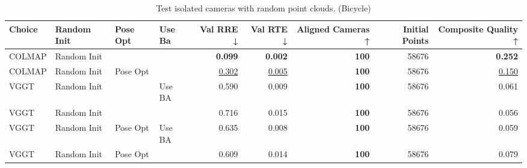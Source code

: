 \begin{table}[H]
\caption{Test isolated cameras with random point clouds. (Bicycle)}
\label{tab:06_isolated_cams_bicycle}
\small
\begin{tabular}{llllrrrrr}
\toprule
Choice & Random Init & Pose Opt & Use Ba & Val RRE ↓ & Val RTE ↓ & Aligned Cameras ↑ & Initial Points & Composite Quality ↑ \\
\midrule
COLMAP & Random Init &  &  & \textbf{0.099} & \textbf{0.002} & \textbf{100} & 58676 & \textbf{0.252} \\
COLMAP & Random Init & Pose Opt &  & \underline{0.302} & \underline{0.005} & \textbf{100} & 58676 & \underline{0.150} \\
VGGT & Random Init &  & Use BA & 0.590 & 0.009 & \textbf{100} & 58676 & 0.061 \\
VGGT & Random Init &  &  & 0.716 & 0.015 & \textbf{100} & 58676 & 0.056 \\
VGGT & Random Init & Pose Opt & Use BA & 0.635 & 0.008 & \textbf{100} & 58676 & 0.059 \\
VGGT & Random Init & Pose Opt &  & 0.609 & 0.014 & \textbf{100} & 58676 & 0.079 \\
\bottomrule
\end{tabular}
\end{table}